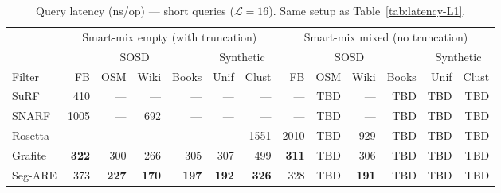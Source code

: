 \begin{table}[H]
    \centering
    \footnotesize
    \setlength{\tabcolsep}{4pt}
    \begin{tabular}{@{}lrrrrrr|rrrrrr@{}}
        \toprule
        & \multicolumn{6}{c|}{Smart-mix empty (with truncation)} & \multicolumn{6}{c}{Smart-mix mixed (no truncation)} \\
        \cmidrule(lr){2-7} \cmidrule(lr){8-13}
        & \multicolumn{4}{c}{SOSD} & \multicolumn{2}{c|}{Synthetic} & \multicolumn{4}{c}{SOSD} & \multicolumn{2}{c}{Synthetic} \\
        \cmidrule(lr){2-5} \cmidrule(lr){6-7} \cmidrule(lr){8-11} \cmidrule(lr){12-13}
        Filter & FB & OSM & Wiki & Books & Unif & Clust & FB & OSM & Wiki & Books & Unif & Clust \\
        \midrule
        SuRF    & 410           & \textnormal{---} & \textnormal{---} & \textnormal{---} & \textnormal{---} & \textnormal{---} & \textnormal{---} & TBD & \textnormal{---} & TBD & TBD & TBD \\
        SNARF   & 1005          & \textnormal{---} & 692           & \textnormal{---} & \textnormal{---} & \textnormal{---} & \textnormal{---} & TBD & \textnormal{---} & TBD & TBD & TBD \\
        Rosetta & \textnormal{---} & \textnormal{---} & \textnormal{---} & \textnormal{---} & \textnormal{---} & 1551          & 2010             & TBD & 929              & TBD & TBD & TBD \\
        Grafite & \textbf{322}  & 300           & 266           & 305           & 307           & 499           & \textbf{311}     & TBD & 306              & TBD & TBD & TBD \\
        Seg-ARE & 373           & \textbf{227}  & \textbf{170}  & \textbf{197}  & \textbf{192}  & \textbf{326}  & 328              & TBD & \textbf{191}     & TBD & TBD & TBD \\
        \bottomrule
    \end{tabular}
    \caption{Query latency (ns/op) --- short queries ($\mathcal{L}=16$).
             Same setup as Table~\ref{tab:latency-L1}.}
    \label{tab:latency-L16}
\end{table}

